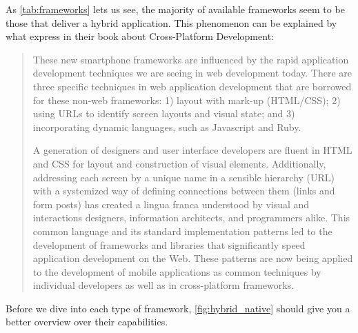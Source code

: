 As \autoref{tab:frameworks} lets us see, the majority of available frameworks seem to be those that deliver a hybrid application. This phenomenon can be explained by what \citeauthor{allen:2010} express in their book about Cross-Platform Development:
\begin{quotation}
These new smartphone frameworks are influenced by the rapid application development techniques we are seeing in web development today. There are three specific techniques in web application development that are borrowed for these non-web frameworks: 1) layout with mark-up (HTML/CSS); 2) using URLs to identify screen layouts and visual state; and 3) incorporating dynamic languages, such as Javascript and Ruby.

A generation of designers and user interface developers are fluent in HTML and CSS for layout and construction of visual elements. Additionally, addressing each screen by a unique name in a sensible hierarchy (URL) with a systemized way of defining connections between them (links and form posts) has created a lingua franca understood by visual and interactions designers, information architects, and programmers alike. This common language and its standard implementation patterns led to the development of frameworks and libraries that significantly speed application development on the Web. These patterns are now being applied to the development of mobile applications as common techniques by individual developers as well as in cross-platform frameworks.
\cite[p. 23]{allen:2010}
\end{quotation}
Before we dive into each type of framework, \autoref{fig:hybrid_native} should give you a better overview over their capabilities.\\

